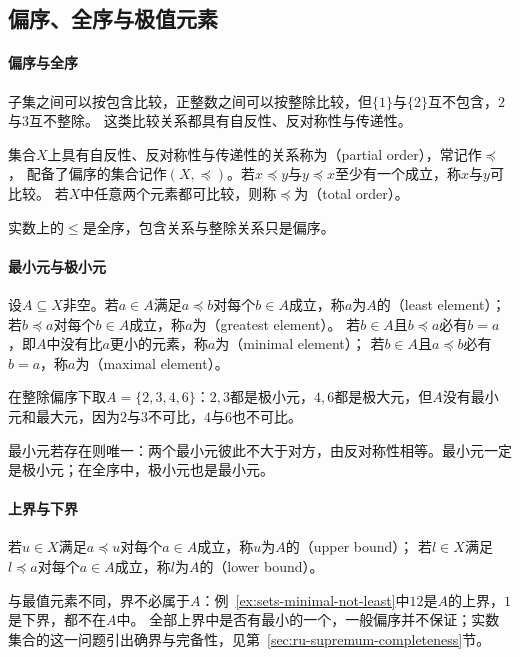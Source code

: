 \subsection{偏序、全序与极值元素}
\label{sec:prelim-order-relations}

\paragraph{偏序与全序}
子集之间可以按包含比较，正整数之间可以按整除比较，但$\{1\}$与$\{2\}$互不包含，$2$与$3$互不整除。
这类比较关系都具有自反性、反对称性与传递性。
\begin{definition}[偏序关系]
\label{def:prelim-partial-order}
集合$X$上具有自反性、反对称性与传递性的关系称为（partial order），常记作$\preceq$，
配备了偏序的集合记作$(X,\preceq)$。若$x\preceq y$与$y\preceq x$至少有一个成立，称$x$与$y$可比较。
若$X$中任意两个元素都可比较，则称$\preceq$为（total order）。
\end{definition}
实数上的$\leq$是全序，包含关系与整除关系只是偏序。

\paragraph{最小元与极小元}
设$A\subseteq X$非空。若$a\in A$满足$a\preceq b$对每个$b\in A$成立，称$a$为$A$的（least element）；
若$b\preceq a$对每个$b\in A$成立，称$a$为（greatest element）。
若$b\in A$且$b\preceq a$必有$b=a$，即$A$中没有比$a$更小的元素，称$a$为（minimal element）；
若$b\in A$且$a\preceq b$必有$b=a$，称$a$为（maximal element）。

\begin{example}[有极小元而无最小元]
\label{ex:sets-minimal-not-least}
在整除偏序下取$A=\{2,3,4,6\}$：$2,3$都是极小元，$4,6$都是极大元，但$A$没有最小元和最大元，因为$2$与$3$不可比，$4$与$6$也不可比。
\end{example}
最小元若存在则唯一：两个最小元彼此不大于对方，由反对称性相等。最小元一定是极小元；在全序中，极小元也是最小元。

\paragraph{上界与下界}
若$u\in X$满足$a\preceq u$对每个$a\in A$成立，称$u$为$A$的（upper bound）；
若$l\in X$满足$l\preceq a$对每个$a\in A$成立，称$l$为$A$的（lower bound）。

与最值元素不同，界不必属于$A$：例~\ref{ex:sets-minimal-not-least}中$12$是$A$的上界，$1$是下界，都不在$A$中。
全部上界中是否有最小的一个，一般偏序并不保证；实数集合的这一问题引出确界与完备性，见第~\ref{sec:ru-supremum-completeness}节。

